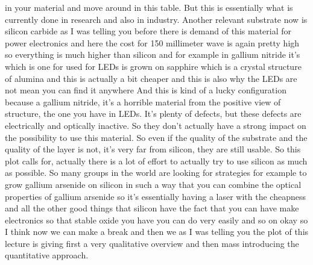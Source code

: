 in your material and move around in this table. But this is essentially what is currently done in research and also in industry. Another relevant substrate now is silicon carbide as I was telling you before there is demand of this material for power electronics and here the cost for 150 millimeter wave is again pretty high so everything is much higher than silicon and for example in gallium nitride it's which is one for used for LEDs is grown on sapphire which is a crystal structure of alumina and this is actually a bit cheaper and this is also why the LEDs are not mean you can find it anywhere And this is kind of a lucky configuration because a gallium nitride, it's a horrible material from the positive view of structure, the one you have in LEDs. It's plenty of defects, but these defects are electrically and optically inactive. So they don't actually have a strong impact on the possibility to use this material. So even if the quality of the substrate and the quality of the layer is not, it's very far from silicon, they are still usable. So this plot calls for, actually there is a lot of effort to actually try to use silicon as much as possible. So many groups in the world are looking for strategies for example to grow gallium arsenide on silicon in such a way that you can combine the optical properties of gallium arsenide so it's essentially having a laser with the cheapness and all the other good things that silicon have the fact that you can have make electronics so that stable oxide you have you can do very easily and so on okay so I think now we can make a break and then we as I was telling you the plot of this lecture is giving first a very qualitative overview and then mass introducing the quantitative approach.

